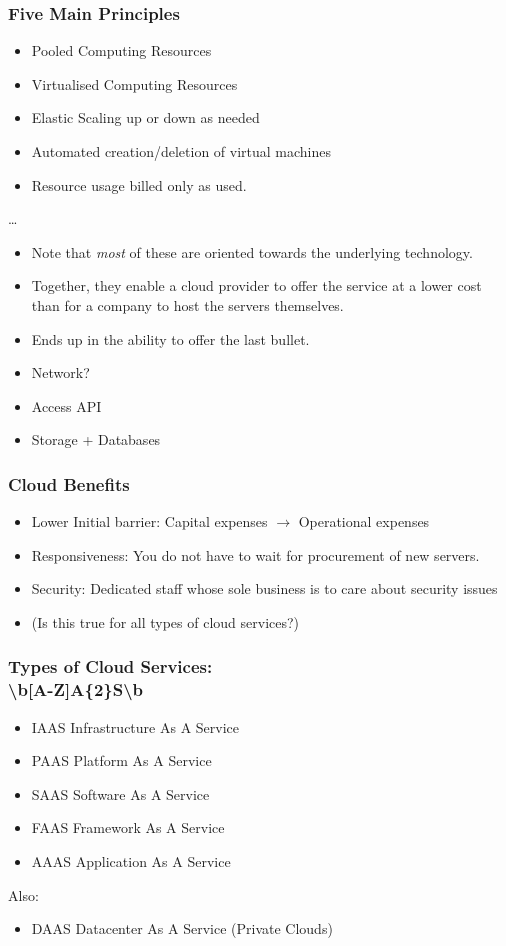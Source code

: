 \documentclass[10pt]{beamer}
\def\subitem{\item[\hspace{1.5cm} -]}
\begin{document}
\begin{frame}[t]
\frametitle{Five Main Principles}
\begin{itemize}
\item Pooled Computing Resources
\item Virtualised Computing Resources
\item Elastic Scaling up or down as needed
\item Automated creation/deletion of virtual machines
\item Resource usage billed only as used.
\end{itemize}

\pause
\ldots
\begin{itemize}
\item Note that \emph{most} of these are oriented towards the underlying technology.
\item Together, they enable a cloud provider to offer the service at a lower cost than for a company to host the servers themselves.
\item Ends up in the ability to offer the last bullet.
\item Network?
\item Access API
\item Storage + Databases
\end{itemize}
\end{frame}


\begin{frame}[t]
\frametitle{Cloud Benefits}

\begin{itemize}
\item Lower Initial barrier: Capital expenses $\rightarrow$ Operational expenses
\item Responsiveness: You do not have to wait for procurement of new servers.
\item Security: Dedicated staff whose sole business is to care about security issues
\subitem (Is this true for all types of cloud services?)
\end{itemize}
\end{frame}


\begin{frame}[t]
\frametitle{Types of Cloud Services:\\ {\textbackslash}b[A-Z]A\{2\}S{\textbackslash}b}
\begin{itemize}
\item IAAS Infrastructure As A Service
\item PAAS Platform As A Service
\item SAAS Software As A Service
\item FAAS Framework As A Service
\item AAAS Application As A Service
\end{itemize}

Also:
\begin{itemize}
\item DAAS Datacenter As A Service (Private Clouds)
\end{itemize}
\end{frame}
\end{document}
